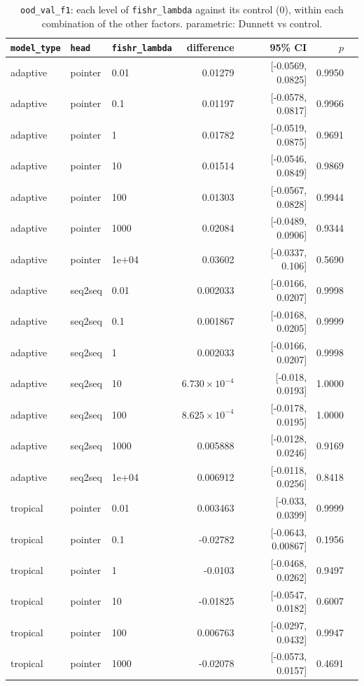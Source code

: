 \documentclass[10pt]{article}
\begin{document}
{\small
\begin{longtable}{lllrrrl}
\caption{\texttt{ood\_val\_f1}: each level of \texttt{fishr\_lambda} against its control (0), within each combination of the other factors. parametric: Dunnett vs control.}\label{tab:control-ood_val_f1}\\
\toprule
\texttt{model\_type} & \texttt{head} & \texttt{fishr\_lambda} & difference & 95\% CI & $p$ & \\
\midrule
\endhead
adaptive & pointer & 0.01 & 0.01279 & [-0.0569, 0.0825] & 0.9950 & \\
adaptive & pointer & 0.1 & 0.01197 & [-0.0578, 0.0817] & 0.9966 & \\
adaptive & pointer & 1 & 0.01782 & [-0.0519, 0.0875] & 0.9691 & \\
adaptive & pointer & 10 & 0.01514 & [-0.0546, 0.0849] & 0.9869 & \\
adaptive & pointer & 100 & 0.01303 & [-0.0567, 0.0828] & 0.9944 & \\
adaptive & pointer & 1000 & 0.02084 & [-0.0489, 0.0906] & 0.9344 & \\
adaptive & pointer & 1e+04 & 0.03602 & [-0.0337, 0.106] & 0.5690 & \\
adaptive & seq2seq & 0.01 & 0.002033 & [-0.0166, 0.0207] & 0.9998 & \\
adaptive & seq2seq & 0.1 & 0.001867 & [-0.0168, 0.0205] & 0.9999 & \\
adaptive & seq2seq & 1 & 0.002033 & [-0.0166, 0.0207] & 0.9998 & \\
adaptive & seq2seq & 10 & $6.730\times10^{-4}$ & [-0.018, 0.0193] & 1.0000 & \\
adaptive & seq2seq & 100 & $8.625\times10^{-4}$ & [-0.0178, 0.0195] & 1.0000 & \\
adaptive & seq2seq & 1000 & 0.005888 & [-0.0128, 0.0246] & 0.9169 & \\
adaptive & seq2seq & 1e+04 & 0.006912 & [-0.0118, 0.0256] & 0.8418 & \\
tropical & pointer & 0.01 & 0.003463 & [-0.033, 0.0399] & 0.9999 & \\
tropical & pointer & 0.1 & -0.02782 & [-0.0643, 0.00867] & 0.1956 & \\
tropical & pointer & 1 & -0.0103 & [-0.0468, 0.0262] & 0.9497 & \\
tropical & pointer & 10 & -0.01825 & [-0.0547, 0.0182] & 0.6007 & \\
tropical & pointer & 100 & 0.006763 & [-0.0297, 0.0432] & 0.9947 & \\
tropical & pointer & 1000 & -0.02078 & [-0.0573, 0.0157] & 0.4691 & \\

\end{longtable}}
\end{document}
